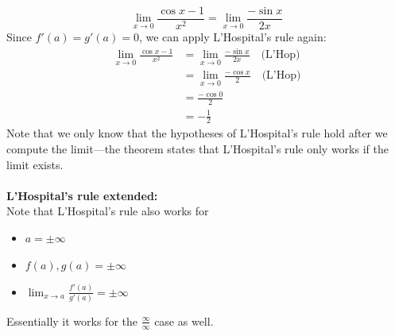 \documentclass{report}
\begin{document}
\begin{equation*}
\lim_{x\to0}\frac{\cos x-1}{x^2}=\lim_{x\to0}\frac{-\sin x}{2x}
\end{equation*}
Since $f'(a)=g'(a)=0$, we can apply L'Hospital's rule again:
\begin{align*}
\lim_{x\to0}\frac{\cos x-1}{x^2}
&=\lim_{x\to0}\frac{-\sin x}{2x}\quad\text{(L'Hop)}\\
&=\lim_{x\to0}\frac{-\cos x}{2}\quad\text{(L'Hop)}\\
&=\frac{-\cos0}{2}\\
&=-\frac{1}{2}
\end{align*}
Note that we only know that the hypotheses of L'Hospital's rule hold after we compute the 
limit---the theorem states that L'Hospital's rule only works if the limit exists.\\
\vspace{1mm}\\
\textbf{L'Hospital's rule extended:}\\
Note that L'Hospital's rule also works for
\begin{itemize}
\item $a=\pm\infty$
\item $f(a),g(a)=\pm\infty$
\item $\lim_{x\to a}\frac{f'(a)}{g'(a)}=\pm\infty$
\end{itemize}
Essentially it works for the $\frac{\infty}{\infty}$ case as well.
\newpage
\end{document}
